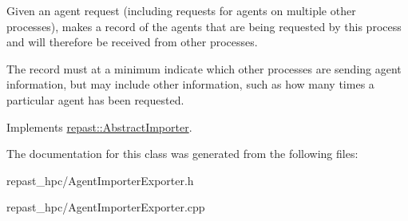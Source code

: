 Given an agent request (including requests for agents on multiple other processes), makes a record of the agents that are being requested by this process and will therefore be received from other processes. 

The record must at a minimum indicate which other processes are sending agent information, but may include other information, such as how many times a particular agent has been requested. 

Implements \hyperlink{classrepast_1_1_abstract_importer_a1353cfde773ce5b3e7011571aff1f823}{repast\-::\-Abstract\-Importer}.



The documentation for this class was generated from the following files\-:\begin{DoxyCompactItemize}
\item 
repast\-\_\-hpc/Agent\-Importer\-Exporter.\-h\item 
repast\-\_\-hpc/Agent\-Importer\-Exporter.\-cpp\end{DoxyCompactItemize}
